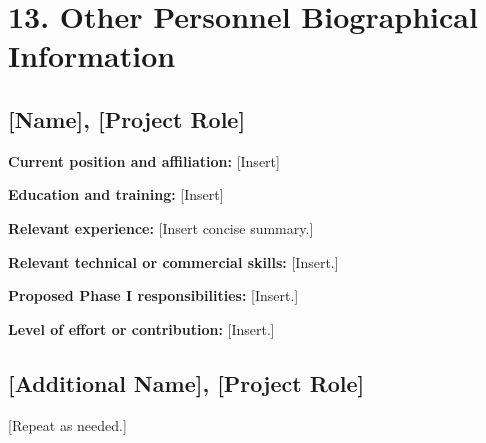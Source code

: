 \documentclass[11pt,letterpaper]{article}
\begin{document}
\section*{13. Other Personnel Biographical Information}


\subsection*{[Name], [Project Role]}
\textbf{Current position and affiliation:} [Insert]

\textbf{Education and training:} [Insert]

\textbf{Relevant experience:} [Insert concise summary.]

\textbf{Relevant technical or commercial skills:} [Insert.]

\textbf{Proposed Phase I responsibilities:} [Insert.]

\textbf{Level of effort or contribution:} [Insert.]

\subsection*{[Additional Name], [Project Role]}
[Repeat as needed.]
\end{document}
